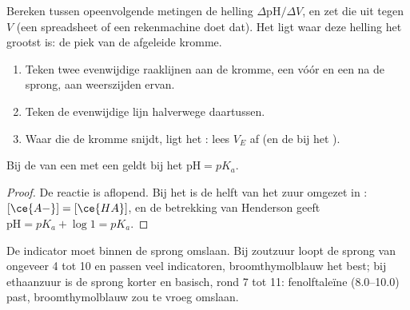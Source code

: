 \begin{method}[De afgeleidemethode]\label{met:g12:ph-conductivity-titrations:derivative}
Bereken tussen opeenvolgende metingen de helling
$\Delta\mathrm{pH}/\Delta V$, en zet die uit tegen $V$ (een spreadsheet of
een rekenmachine doet dat). Het  ligt waar deze helling
het grootst is: de piek van de afgeleide kromme.
\end{method}

\begin{method}[De raaklijnenmethode]\label{met:g12:ph-conductivity-titrations:tangent}
\begin{enumerate}
  \item Teken twee evenwijdige raaklijnen aan de kromme, een vóór en een
        na de sprong, aan weerszijden ervan.
  \item Teken de evenwijdige lijn halverwege daartussen.
  \item Waar die de kromme snijdt, ligt het : lees $V_E$
        af (en de  bij het ).
\end{enumerate}
\end{method}

\begin{proposition}[Bij het halfequivalentiepunt is $\mathrm{pH} = pK_a$]\label{prop:g12:ph-conductivity-titrations:half}
Bij de  van een   met een  geldt bij
het  $\mathrm{pH} = pK_a$.
\end{proposition}

\begin{proof}
De reactie  is aflopend. Bij het
 is de helft van het zuur omgezet in :
$[\ce{A-}] = [\ce{HA}]$, en de betrekking van Henderson geeft
$\mathrm{pH} = pK_a + \log 1 = pK_a$.
\end{proof}

\begin{remark}\label{rem:g12:ph-conductivity-titrations:indicator}
De indicator moet binnen de sprong omslaan. Bij zoutzuur loopt de sprong
van ongeveer  4 tot 10 en passen veel indicatoren, broomthymolblauw het
best; bij ethaanzuur is de sprong korter en basisch, rond 7 tot 11:
fenolftaleïne (8.0--10.0) past, broomthymolblauw zou te vroeg
omslaan.
\end{remark}

